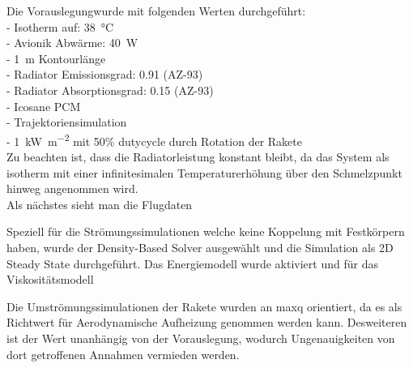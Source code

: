 Die Vorauslegungwurde mit folgenden Werten durchgeführt:\\
- Isotherm auf: \SI{38}{\celsius}\\
- Avionik Abwärme: \SI{40}{W}\\
- \SI{1}{m} Kontourlänge\\
- Radiator Emissionsgrad: \SI{0,91}{} (AZ-93)\\
- Radiator Absorptionsgrad: \SI{0,15}{} (AZ-93)\\
- Icosane PCM\\
- Trajektoriensimulation\\
- \SI{1}{\kilo\watt\per\meter\squared} mit 50\% dutycycle durch Rotation der Rakete\\
Zu beachten ist, dass die Radiatorleistung konstant bleibt, da das System als isotherm mit einer
infinitesimalen Temperaturerhöhung über den Schmelzpunkt hinweg angenommen wird.\\
Als nächstes sieht man die Flugdaten

Speziell für die Strömungssimulationen welche keine Koppelung mit Festkörpern haben, wurde der Density-Based Solver ausgewählt und die
Simulation als 2D Steady State durchgeführt. Das Energiemodell wurde aktiviert und für das Viskositätsmodell~\cite{Irving-2021}

Die Umströmungssimulationen der Rakete wurden an \ac{maxq} orientiert, da es als Richtwert für Aerodynamische Aufheizung genommen werden kann.
Desweiteren ist der Wert unanhängig von der Vorauslegung, wodurch Ungenauigkeiten von dort getroffenen Annahmen vermieden werden.\\


